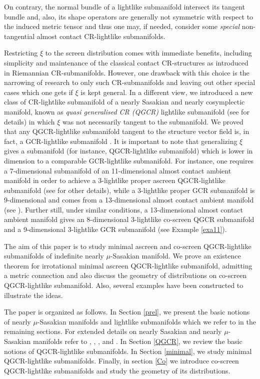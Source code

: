 \documentclass[reqno, 12pt]{amsart}
\numberwithin{equation}{section}
\begin{document}
  On contrary, the normal bundle of a lightlike submanifold intersect its tangent bundle and, also, its shape operators  are  generally not symmetric with respect to the induced metric tensor and thus one may, if needed, consider some \textit{special} non-tangential almost contact CR-lightlike submanifolds. 
  
 Restricting $\xi$ to the screen distribution comes with immediate benefits, including simplicity and maintenance of the classical contact CR-structures as introduced in Riemannian CR-submanifolds. However, one drawback with this choice is the narrowing of research to only such CR-submanifolds and leaving out other special cases which one gets if $\xi$ is kept general. In a different view,  we introduced a new class of CR-lightlike submanifold of a nearly Sasakian and nearly cosymplectic manifold, known as \textit{quasi generalised CR (QGCR)} lightlike submanifold (see \cite{ms} for details) in which $\xi$ was not necessarily tangent to the submanifold. We proved that any QGCR-lightlike submanifold tangent to the structure vector field is, in fact, a GCR-lightlike submanifold \cite{ds3}. It is important to note that generalizing $\xi$ gives a submanifold (for instance, QGCR-lightlike submanifold) which is lower in dimension to a comparable GCR-lightlike submanifold. For instance, one requires a 7-dimensional submanifold of an 11-dimensional almost contact ambient manifold in order to achieve a 3-lightlike proper ascreen QGCR-lightlike submanifold (see  \cite{ms} for other details), while a 3-lightlike proper GCR submanifold is 9-dimensional and comes from a 13-dimensional almost contact ambient manifold (see \cite{ds3}). Further still, under similar conditions, a 13-dimensional almost contact ambient manifold gives an 8-dimensional 3-lightlike co-screen QGCR submanifold and a 9-dimensional 3-lightlike GCR submanifold (see Example \ref{exa11}).  

The aim of this paper is to study minimal ascreen and co-screen QGCR-lightlike submanifolds of indefinite nearly $\mu$-Sasakian manifold. We prove an existence theorem for irrotational minimal ascreen QGCR-lightlike submanifold, admitting a metric connection and also discuss the geometry of distributions on co-screen QGCR-lightlike submanifold. Also, several examples have been constructed to illustrate the ideas. 

The paper is organized as follows. In Section \ref{prel}, we present the basic notions of nearly $\mu$-Sasakian manifolds and lightlike submanifolds which we refer to in the remaining sections. For extended details on nearly Sasakian and nearly $\mu$-Sasakian manifolds refer to \cite{mo}, \cite{bl1}, \cite{bl2}, \cite{endo} and \cite{diaz}.  In Section \ref{QGCR}, we review the basic notions of QGCR-lightlike submanifolds. In Section \ref{minimal}, we study minimal QGCR-lightlike submanifolds. Finally, in section \ref{Co} we introduce co-screen QGCR-lightlike submanifolds and study the geometry of its distributions. 
\end{document}
